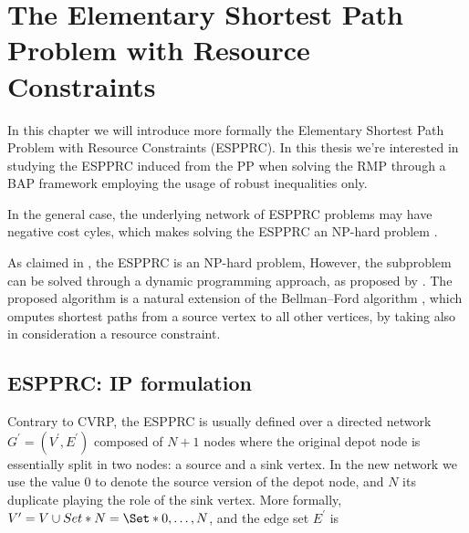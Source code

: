 \chapter{The Elementary Shortest Path Problem with Resource Constraints}
In this chapter we will introduce more formally the Elementary Shortest Path Problem with Resource Constraints (ESPPRC).
In this thesis we're interested in studying the ESPPRC induced from the PP when solving the RMP through a BAP framework employing the usage of robust inequalities only.

In the general case, the underlying network of ESPPRC problems may have negative cost cyles, which makes solving the ESPPRC an NP-hard problem \parencite{dror1994}.

As claimed in \textcite{dror1994}, the ESPPRC is an NP-hard problem,
However, the subproblem can be solved through a dynamic programming approach, as proposed by \textcite{feillet2004}.
The proposed algorithm is a natural extension of the Bellman–Ford algorithm \parencite{bellman1958, fordjr1956},
which omputes shortest paths from a source vertex to all other vertices,
by taking also in consideration a resource constraint.


\begin{comment}
\cite{bettinelli2010mathematical} ---------------
It is possible to address the pricing problem by optimizing its relaxation,
obtained by dropping the elementarity constraints. Solving a resource con-
strained shortest path problem (RCSPP) requires less computing time but
yields less tight lower bounds, since columns may include cycles. The two
different approaches have been followed for instance by Feillet et al. [42] and
Desrochers et al. [29] to solve the vehicle routing problem with time windows
(VRPTW) through column generation.
\end{comment}

\section{ESPPRC: IP formulation}
Contrary to CVRP, the ESPPRC is usually defined over a directed network $G^\prime = (V^\prime, E^\prime)$ composed
of $N + 1$ nodes where the original depot node is essentially split in two nodes: a source and a sink vertex.
In the new network we use the value $0$ to denote the source version of the depot node, and $N$ its duplicate
playing the role of the sink vertex.
More formally, $V^\prime = V \cup Set*{N} = \Set*{ 0,\dots, N }$, and the edge set $E^\prime$ is

